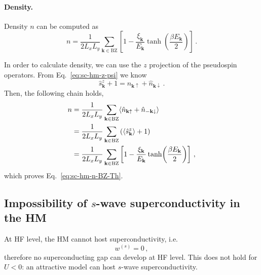 \paragraph{Density.}

Density $n$ can be computed as
\begin{equation}\label{eq:sc-hm-n-BZ-Th}
	n = \frac{1}{2L_x L_y} \sum_{\mathbf{k} \in \mathrm{BZ}} \left[
	1-\frac{\xi_\mathbf{k}}{E_\mathbf{k}}  \tanh(\frac{\beta E_\mathbf{k}}{2})
	\right] \, .
\end{equation}

\begin{tabproof}
	
	In order to calculate density, we can use the $z$ projection of the pseudospin operators. From Eq.~\eqref{eq:sc-hm-z-psi} we know
	\[
	\hat s_\mathbf{k}^z+1 = \hat n_{\mathbf{k}\uparrow} + \hat n_{\mathbf{k}\downarrow} \, .
	\]
	Then, the following chain holds,
	\[
	\begin{aligned}
		n &= \frac{1}{2L_x L_y} \sum_{\mathbf{k} \in \mathrm{BZ}} \langle 
		\hat n_{\mathbf{k}\uparrow} + \hat n_{-\mathbf{k}\downarrow} 
		\rangle \\
		&= \frac{1}{2L_x L_y} \sum_{\mathbf{k} \in \mathrm{BZ}} \left(
		\ev{\hat s_\mathbf{k}^z}+1
		\right) \\
		&= \frac{1}{2L_x L_y} \sum_{\mathbf{k} \in \mathrm{BZ}} \left[
		1-\frac{\xi_\mathbf{k}}{E_\mathbf{k}}  \tanh(\frac{\beta E_\mathbf{k}}{2})
		\right] \, ,
	\end{aligned}
	\]
	which proves Eq.~\eqref{eq:sc-hm-n-BZ-Th}.
	
\end{tabproof}

\subsection{Impossibility of $s$-wave superconductivity in the HM}\label{appsubsec:sc-w^s=0}

At HF level, the HM cannot host superconductivity, i.e.
\begin{equation}\label{appeq:sc-hm-ws=0}
	w^{(s)} = 0 \, ,
\end{equation}
therefore no superconducting gap can develop at HF level. This does not hold for $U<0$: an attractive model can host $s$-wave superconductivity.

